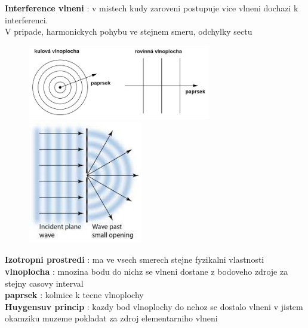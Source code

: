 \documentclass{report}
\begin{document}
\textbf{Interference vlneni} : v mistech kudy zaroveni postupuje vice vlneni dochazi k interferenci.\\
V pripade, harmonickych pohybu ve stejnem smeru, odchylky sectu \\
\newpage
\begin{figure}
  \includegraphics[width=8cm]{images/vlnoplocha.png}
  \smallskip\par
  \includegraphics[width=5cm]{images/huygens.jpeg}
\end{figure}%
\textbf{Izotropni prostredi} : ma ve vsech smerech stejne fyzikalni vlastnosti \\ 
\textbf{vlnoplocha} : mnozina bodu do nichz se vlneni dostane z bodoveho zdroje za stejny casovy interval \\
\textbf{paprsek} : kolmice k tecne vlnoplochy
\ \\[40pt]
\textbf{Huygensuv princip} : kazdy bod vlnoplochy do nehoz se dostalo vlneni v jistem okamziku muzeme pokladat za zdroj elementarniho vlneni \\
\end{document}
